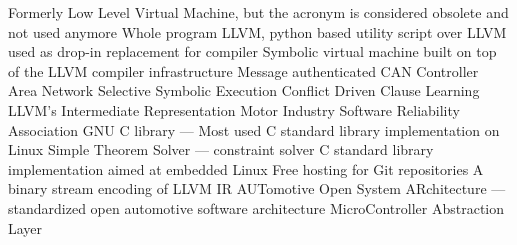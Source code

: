   {Formerly Low Level Virtual Machine, but the acronym is
               considered obsolete and not used anymore}
 {Whole program LLVM, python based utility script over LLVM used
               as drop-in replacement for compiler}
  {Symbolic virtual machine built on top of the LLVM compiler
               infrastructure}
 {Message authenticated CAN}
 {Controller Area Network}
 {Selective Symbolic Execution}
 {Conflict Driven Clause Learning}
 {LLVM's Intermediate Representation}
 {Motor Industry Software Reliability Association}
 {GNU C library --- Most used C standard library implementation on
               Linux}
 {Simple Theorem Solver --- constraint solver}
 {C standard library implementation aimed at embedded Linux}
 {Free hosting for Git repositories}
 {A binary stream encoding of LLVM IR}
 {AUTomotive Open System ARchitecture --- standardized open
                 automotive software architecture}
 {MicroController Abstraction Layer}